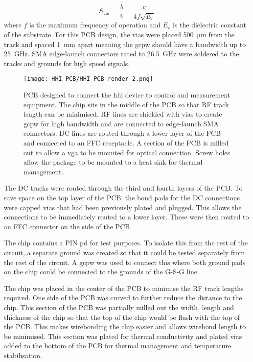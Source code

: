\begin{equation}
	S_\text{via} = \frac{\lambda}{4} = \frac{c}{4 f \sqrt{E_r}}
\end{equation}
where $f$ is the maximum frequency of operation and $E_r$ is the dielectric constant of the substrate. For this PCB design, the vias were placed \SI{500}{\um} from the track and spaced \SI{1}{\mm} apart meaning the \ac{gcpw} should have a bandwidth up to \SI{25}{GHz}. SMA edge-launch connectors rated to \SI{26.5}{GHz} were soldered to the tracks and grounds for high speed signals.

\begin{figure}[t]
	\centering
	\texttt{[image: HHI\_PCB/HHI\_PCB\_render\_2.png]}
	\caption[PCB breakout for an InP integrated circuit]{PCB designed to connect the \acs{hhi} device to control and measurement equipment. The chip sits in the middle of the PCB so that RF track length can be minimised. RF lines are shielded with vias to create \acs{gcpw} for high bandwidth and are connected to edge-launch SMA connectors. DC lines are routed through a lower layer of the PCB and connected to an FFC receptacle. A section of the PCB is milled out to allow a \acs{vga} to be mounted for optical connection. Screw holes allow the package to be mounted to a heat sink for thermal management.}
	\label{fig:hhi_pcb}
\end{figure}

The DC tracks were routed through the third and fourth layers of the PCB. To save space on the top layer of the PCB, the bond pads for the DC connections were capped vias that had been previously plated and plugged. This allows the connections to be immediately routed to a lower layer. These were then routed to an FFC connector on the side of the PCB.

The chip contains a PIN \ac{pd} for test purposes. To isolate this from the rest of the circuit, a separate ground was created so that it could be tested separately from the rest of the circuit. A \ac{gcpw} was used to connect this where both ground pads on the chip could be connected to the grounds of the G-S-G line.


The chip was placed in the center of the PCB to minimise the RF track lengths required. One side of the PCB was curved to further reduce the distance to the chip. This section of the PCB was partially milled out the width, length and thickness of the chip so that the top of the chip would be flush with the top of the PCB. This makes wirebonding the chip easier and allows wirebond length to be minimised. This section was plated for thermal conductivity and plated vias added to the bottom of the PCB for thermal management and temperature stabilisation. 

